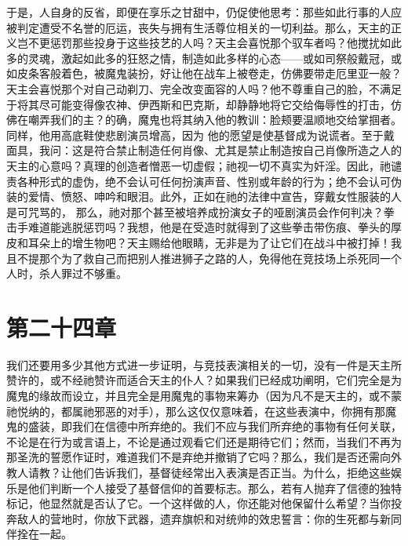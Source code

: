 于是，人自身的反省，即便在享乐之甘甜中，仍促使他思考：那些如此行事的人应被判定遭受不名誉的厄运，丧失与拥有生活尊位相关的一切利益。那么，天主的正义岂不更惩罚那些投身于这些技艺的人吗？天主会喜悦那个驭车者吗？他搅扰如此多的灵魂，激起如此多的狂怒之情，制造如此多样的心态——或如司祭般戴冠，或如皮条客般着色，被魔鬼装扮，好让他在战车上被卷走，仿佛要带走厄里亚一般？天主会喜悦那个对自己动剃刀、完全改变面容的人吗？他不尊重自己的脸，不满足于将其尽可能变得像农神、伊西斯和巴克斯，却静静地将它交给侮辱性的打击，仿佛在嘲弄我们的主？的确，魔鬼也将其纳入他的教训：脸颊要温顺地交给掌掴者。同样，他用高底鞋使悲剧演员增高，因为 他的愿望是使基督成为说谎者。至于戴面具，我问：这是符合禁止制造任何肖像、尤其是禁止制造按自己肖像所造之人的天主的心意吗？真理的创造者憎恶一切虚假；祂视一切不真实为奸淫。因此，祂谴责各种形式的虚伪，绝不会认可任何扮演声音、性别或年龄的行为；绝不会认可伪装的爱情、愤怒、呻吟和眼泪。此外，正如在祂的法律中宣告，穿戴女性服装的人是可咒骂的， 那么，祂对那个甚至被培养成扮演女子的哑剧演员会作何判决？拳击手难道能逃脱惩罚吗？我想，他是在受造时就得到了这些拳击带伤痕、拳头的厚皮和耳朵上的增生物吧？天主赐给他眼睛，无非是为了让它们在战斗中被打掉！我且不提那个为了救自己而把别人推进狮子之路的人，免得他在竞技场上杀死同一个人时，杀人罪过不够重。\par


\section{第二十四章}

我们还要用多少其他方式进一步证明，与竞技表演相关的一切，没有一件是天主所赞许的，或不经祂赞许而适合天主的仆人？如果我们已经成功阐明，它们完全是为魔鬼的缘故而设立，并且完全是用魔鬼的事物来筹办（因为凡不是天主的，或不蒙祂悦纳的，都属祂邪恶的对手），那么这仅仅意味着，在这些表演中，你拥有那魔鬼的盛装，即我们在信德中所弃绝的。我们不应与我们所弃绝的事物有任何关联，不论是在行为或言语上，不论是通过观看它们还是期待它们；然而，当我们不再为那圣洗的誓愿作证时，难道我们不是弃绝并撤销了它吗？那么，我们是否还需向外教人请教？让他们告诉我们，基督徒经常出入表演是否正当。为什么，拒绝这些娱乐是他们判断一个人接受了基督信仰的首要标志。那么，若有人抛弃了信德的独特标记，他显然就是否认了它。一个这样做的人，你还能对他保留什么希望？当你投奔敌人的营地时，你放下武器，遗弃旗帜和对统帅的效忠誓言：你的生死都与新同伴拴在一起。\par

